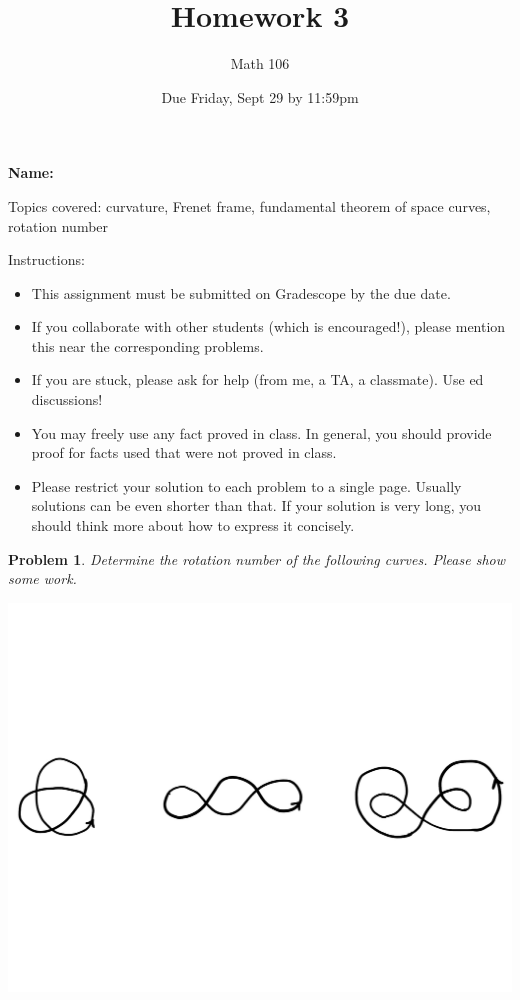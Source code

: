 \documentclass[11pt]{article}
\author{Math 106}
\date{Due Friday, Sept 29 by 11:59pm}
\title{Homework 3}
\newtheorem{problem}{Problem}
\begin{document}
\maketitle

{\bf\Large Name:} 


\vspace{.3in}
Topics covered: curvature, Frenet frame, fundamental theorem of space curves, rotation number

Instructions: 
\begin{itemize}
\item This assignment must be submitted on Gradescope by the due date. 
\item If you collaborate with other students (which is encouraged!), please mention this near the corresponding problems. 
\item If you are stuck, please ask for help (from me, a TA, a classmate). Use ed discussions!  
\item You may freely use any fact proved in class. In general, you should provide proof for facts used that were not proved in class. 
\item Please restrict your solution to each problem to a single page. Usually solutions can be even shorter than that. If your solution is very long, you should think more about how to express it concisely.
\end{itemize}
\pagebreak 



\begin{problem}
Determine the rotation number of the following curves. Please show some work.
\begin{center}
\includegraphics[scale=.5]{rot.pdf}
\end{center}
\end{problem}
\end{document}
